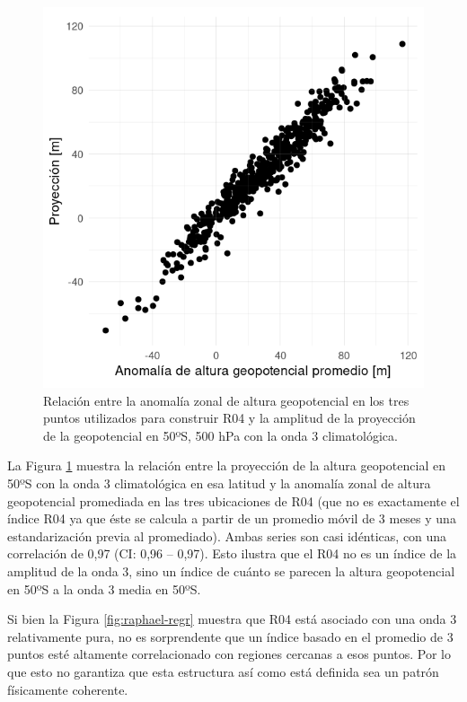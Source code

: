 \documentclass[12pt,oneside,a4paper]{reedthesis}
\begin{document}
\begin{figure}

{\centering \includegraphics{figures/15-onda3/pseudo-raphael-1} 

}

\caption{Relación entre la anomalía zonal de altura geopotencial en los tres puntos utilizados para construir R04 y la amplitud de la proyección de la geopotencial en 50ºS, 500 hPa con la onda 3 climatológica.}\label{fig:pseudo-raphael}
\end{figure}



La Figura \ref{fig:pseudo-raphael} muestra la relación entre la proyección de la altura geopotencial en 50ºS con la onda 3 climatológica en esa latitud y la anomalía zonal de altura geopotencial promediada en las tres ubicaciones de R04 (que no es exactamente el índice R04 ya que éste se calcula a partir de un promedio móvil de 3 meses y una estandarización previa al promediado).
Ambas series son casi idénticas, con una correlación de 0,97 (CI: 0,96 -- 0,97).
Esto ilustra que el R04 no es un índice de la amplitud de la onda 3, sino un índice de cuánto se parecen la altura geopotencial en 50ºS a la onda 3 media en 50ºS.

Si bien la Figura \ref{fig:raphael-regr} muestra que R04 está asociado con una onda 3 relativamente pura, no es sorprendente que un índice basado en el promedio de 3 puntos esté altamente correlacionado con regiones cercanas a esos puntos.
Por lo que esto no garantiza que esta estructura así como está definida sea un patrón físicamente coherente.
\end{document}
